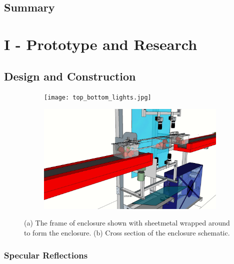 \documentclass[fleqn,twoside]{article}
\begin{document}
\subsection{Summary}





\newpage

\section{I - Prototype and Research}

\subsection{Design and Construction}








\begin{figure}[h]
	\centering
	\begin{subfigure}{.4\textwidth}
		\centering
		\texttt{[image: top\_bottom\_lights.jpg]}
		\caption{}
		\label{fig:enclosure_1}
	\end{subfigure}%
	\begin{subfigure}{.6\textwidth}
		\centering
		\includegraphics[width=.8\linewidth]{QAS_cross_sec.jpg}
		\caption{}
		\label{fig:cross_sec}
	\end{subfigure}%
	\caption{(a) The frame of enclosure shown with sheetmetal wrapped around to form the enclosure. (b) Cross section of the enclosure schematic.}
	\label{}
\end{figure}






\subsubsection{Specular Reflections}
\end{document}
